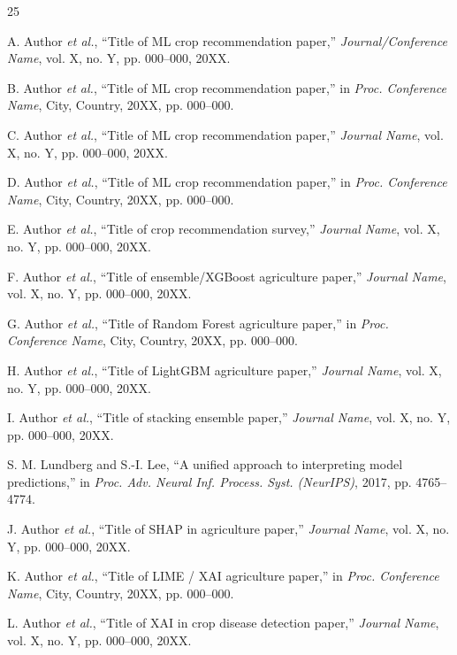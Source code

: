 \documentclass[conference]{IEEEtran}
\begin{document}
\begin{thebibliography}{25}

A. Author \textit{et al.}, ``Title of ML crop recommendation paper,'' \textit{Journal/Conference Name}, vol. X, no. Y, pp. 000--000, 20XX.

B. Author \textit{et al.}, ``Title of ML crop recommendation paper,'' in \textit{Proc. Conference Name}, City, Country, 20XX, pp. 000--000.

C. Author \textit{et al.}, ``Title of ML crop recommendation paper,'' \textit{Journal Name}, vol. X, no. Y, pp. 000--000, 20XX.

D. Author \textit{et al.}, ``Title of ML crop recommendation paper,'' in \textit{Proc. Conference Name}, City, Country, 20XX, pp. 000--000.

E. Author \textit{et al.}, ``Title of crop recommendation survey,'' \textit{Journal Name}, vol. X, no. Y, pp. 000--000, 20XX.

F. Author \textit{et al.}, ``Title of ensemble/XGBoost agriculture paper,'' \textit{Journal Name}, vol. X, no. Y, pp. 000--000, 20XX.

G. Author \textit{et al.}, ``Title of Random Forest agriculture paper,'' in \textit{Proc. Conference Name}, City, Country, 20XX, pp. 000--000.

H. Author \textit{et al.}, ``Title of LightGBM agriculture paper,'' \textit{Journal Name}, vol. X, no. Y, pp. 000--000, 20XX.

I. Author \textit{et al.}, ``Title of stacking ensemble paper,'' \textit{Journal Name}, vol. X, no. Y, pp. 000--000, 20XX.

S. M. Lundberg and S.-I. Lee, ``A unified approach to interpreting model predictions,'' in \textit{Proc. Adv. Neural Inf. Process. Syst. (NeurIPS)}, 2017, pp. 4765--4774.

J. Author \textit{et al.}, ``Title of SHAP in agriculture paper,'' \textit{Journal Name}, vol. X, no. Y, pp. 000--000, 20XX.

K. Author \textit{et al.}, ``Title of LIME / XAI agriculture paper,'' in \textit{Proc. Conference Name}, City, Country, 20XX, pp. 000--000.

L. Author \textit{et al.}, ``Title of XAI in crop disease detection paper,'' \textit{Journal Name}, vol. X, no. Y, pp. 000--000, 20XX.


\end{thebibliography}
\end{document}
